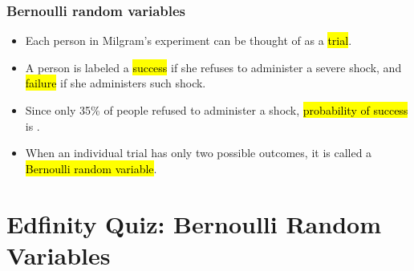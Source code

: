 \documentclass[slidestop,compress,mathserif]{beamer}
\begin{document}
\begin{frame}
\frametitle{Bernoulli random variables}

\begin{itemize}

\item Each person in Milgram's experiment can be thought of as a \hl{trial}.

\item A person is labeled a \hl{success} if she refuses to administer a severe shock, and \hl{failure} if she administers such shock.

\item Since only 35\% of people refused to administer a shock, \hl{probability of success} is .

\item When an individual trial has only two possible outcomes, it is called a \hl{Bernoulli random variable}.

\end{itemize}

\end{frame}


\section{Edfinity Quiz: Bernoulli Random Variables}
\end{document}
